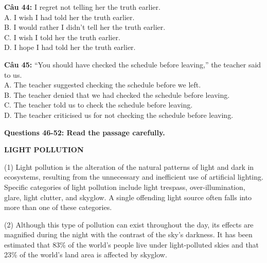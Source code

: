 \documentclass[12pt,a4paper]{article}
\begin{document}



\noindent \textbf{Câu 44:} I regret not telling her the truth earlier.\\
\noindent A. I wish I had told her the truth earlier.\\
\noindent B. I would rather I didn't tell her the truth earlier.\\
\noindent C. I wish I told her the truth earlier.\\
\noindent D. I hope I had told her the truth earlier.




\noindent \textbf{Câu 45:} ``You should have checked the schedule before leaving,'' the teacher said to us.\\
\noindent A. The teacher suggested checking the schedule before we left.\\
\noindent B. The teacher denied that we had checked the schedule before leaving.\\
\noindent C. The teacher told us to check the schedule before leaving.\\
\noindent D. The teacher criticised us for not checking the schedule before leaving.




\noindent\textbf{Questions 46-52: Read the passage carefully.}%
\begin{center}\textbf{LIGHT POLLUTION}\end{center}%


\par\nobreak

(1) Light pollution is the alteration of the natural patterns of light and dark in ecosystems, resulting from the unnecessary and inefficient use of artificial lighting. Specific categories of light pollution include light trespass, over-illumination, glare, light clutter, and skyglow. A single offending light source often falls into more than one of these categories.

(2) Although this type of pollution can exist throughout the day, its effects are magnified during the night with the contrast of the sky's darkness. It has been estimated that 83\% of the world's people live under light-polluted skies and that 23\% of the world's land area is affected by skyglow.
\end{document}
